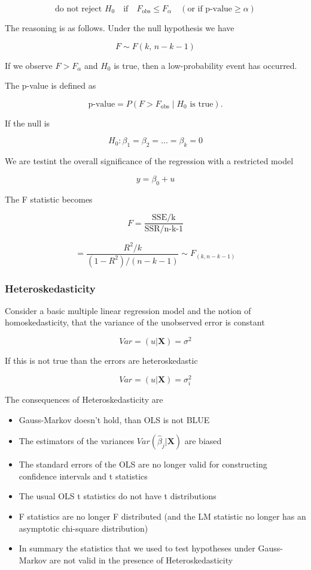 \[
\text{do not reject } H_0 \quad \text{if} \quad F_{\text{obs}} \le F_{\alpha}
\quad (\text{or if p-value} \ge \alpha)
\]

The reasoning is as follows. Under the null hypothesis we have

\[
F \sim F(k,\, n-k-1)
\]

If we observe $F > F_{\alpha}$ and $H_0$ is true, then a low-probability event has occurred.

The p-value is defined as

\[
\text{p-value} = P(F > F_{\text{obs}} \mid H_0 \text{ is true}).
\]


If the null is 

\[
H_0 : \beta_1 = \beta_2 = ... = \beta_k = 0
\]

We are testint the overall significance of the regression with a restricted model 

\[
y = \beta_0 + u
\]

The F statistic becomes

\[
F = \frac{\text{SSE/k}}{\text{SSR/n-k-1}}
\]

\[
= \frac{R^2/k}{(1-R^2)/(n-k-1)} \sim F_{(k, n-k-1)}
\]


\subsubsection{Heteroskedasticity}

Consider a basic multiple linear regression model and the notion of homoskedasticity, that the variance of the unobserved error is constant

\[
Var = (u|\textbf{X}) = \sigma^2
\]

If this is not true than the errors are heteroskedastic

\[
Var = (u|\textbf{X}) = \sigma^2_i
\]

\vspace{10pt}

The consequences of Heteroskedasticity are

\begin{itemize}
    \item Gauss-Markov doesn't hold, than OLS is not BLUE
    \item The estimators of the variances $Var(\hat{\beta}_j | \textbf{X})$ are biased
    \item The standard errors of the OLS are no longer valid for constructing confidence intervals and t statistics
    \item The usual OLS t statistics do not have t distributions
    \item F statistics are no longer F distributed (and the LM statistic no longer has an asymptotic chi-square distribution)
    \item In summary the statistics that we used to test hypotheses under Gauss-Markov are not valid in the presence of Heteroskedasticity
\end{itemize}

